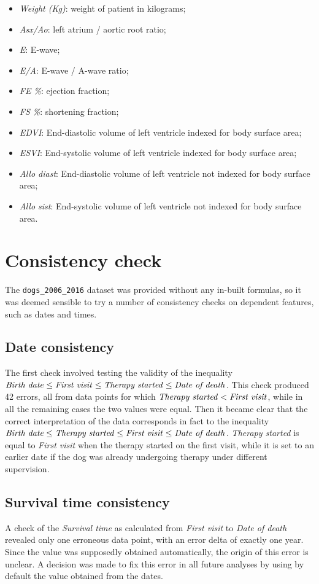 \documentclass[12pt]{report}
\begin{document}
\begin{itemize}
\item \textit{Weight (Kg)}: weight of patient in kilograms;
\item \textit{Asx/Ao}: left atrium / aortic root ratio;
\item \textit{E}: E-wave;
\item \textit{E/A}:	E-wave / A-wave ratio;
\item \textit{FE \%}: ejection fraction;
\item \textit{FS \%}: shortening fraction;
\item \textit{EDVI}: End-diastolic volume of left ventricle indexed for body surface area;
\item \textit{ESVI}: End-systolic volume of left ventricle indexed for body surface area;
\item \textit{Allo diast}: End-diastolic volume of left ventricle not indexed for body surface area;
\item \textit{Allo sist}: End-systolic volume of left ventricle not indexed for body surface area.
\end{itemize}

\section{Consistency check}
The \texttt{dogs\_2006\_2016} dataset was provided without any in-built formulas, so it was deemed sensible to try a number of consistency checks on dependent features, such as dates and times.
\subsection*{Date consistency}
The first check involved testing the validity of the inequality $ \text{\emph{Birth date}} \leq \text{\emph{First visit}} \leq \text{\emph{Therapy started}} \leq \text{\emph{Date of death}} $. This check produced 42 errors, all from data points for which $ \text{\emph{Therapy started}} < \text{\emph{First visit}} $, while in all the remaining cases the two values were equal. Then it became clear that the correct interpretation of the data corresponds in fact to the inequality $ \text{\emph{Birth date}} \leq \text{\emph{Therapy started}} \leq \text{\emph{First visit}} \leq \text{\emph{Date of death}} $. \textit{Therapy started} is equal to \textit{First visit} when the therapy started on the first visit, while it is set to an earlier date if the dog was already undergoing therapy under different supervision.
\subsection*{Survival time consistency}
A check of the \textit{Survival time} as calculated from \textit{First visit} to \textit{Date of death} revealed only one erroneous data point, with an error delta of exactly one year. Since the value was supposedly obtained automatically, the origin of this error is unclear. A decision was made to fix this error in all future analyses by using by default the value obtained from the dates.
\end{document}
